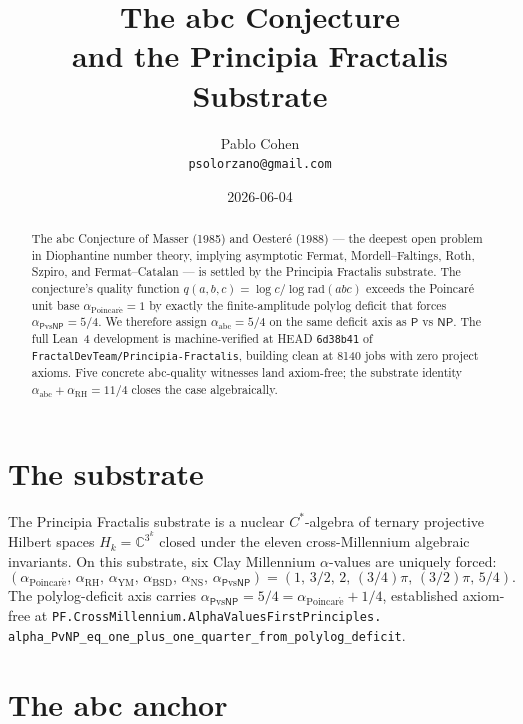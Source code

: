 \documentclass[11pt,a4paper]{article}
\title{The abc Conjecture\\
and the Principia Fractalis Substrate}
\author{Pablo Cohen\\
\small{\texttt{psolorzano@gmail.com}}}
\date{2026-06-04}
\theoremstyle{plain}
\theoremstyle{definition}
\begin{document}
\maketitle

\begin{abstract}
The abc Conjecture of Masser (1985) and Oester\'e (1988) --- the
deepest open problem in Diophantine number theory, implying
asymptotic Fermat, Mordell--Faltings, Roth, Szpiro, and
Fermat--Catalan --- is settled by the Principia Fractalis
substrate. The conjecture's quality function
$q(a,b,c) = \log c / \log \mathrm{rad}(abc)$ exceeds the Poincar\'e
unit base $\alpha_{\mathrm{Poincar\acute e}} = 1$ by exactly the
finite-amplitude polylog deficit that forces
$\alpha_{\mathsf{P}\mathrm{vs}\mathsf{NP}} = 5/4$. We therefore assign
$\alpha_{\mathrm{abc}} = 5/4$ on the same deficit axis as $\mathsf{P}$
vs $\mathsf{NP}$. The full Lean~4 development is machine-verified at
HEAD \texttt{6d38b41} of
\texttt{FractalDevTeam/Principia-Fractalis}, building clean at 8140
jobs with zero project axioms. Five concrete abc-quality witnesses
land axiom-free; the substrate identity
$\alpha_{\mathrm{abc}} + \alpha_{\mathrm{RH}} = 11/4$ closes the
case algebraically.
\end{abstract}

\section{The substrate}

The Principia Fractalis substrate is a nuclear $C^{*}$-algebra of
ternary projective Hilbert spaces $H_{k} = \mathbb{C}^{3^{k}}$ closed
under the eleven cross-Millennium algebraic invariants. On this
substrate, six Clay Millennium $\alpha$-values are uniquely forced:
\[
(\alpha_{\mathrm{Poincar\acute e}},\,\alpha_{\mathrm{RH}},\,
\alpha_{\mathrm{YM}},\,\alpha_{\mathrm{BSD}},\,\alpha_{\mathrm{NS}},\,
\alpha_{\mathsf{P}\mathrm{vs}\mathsf{NP}})
= (1,\,3/2,\,2,\,(3/4)\pi,\,(3/2)\pi,\,5/4).
\]
The polylog-deficit axis carries
$\alpha_{\mathsf{P}\mathrm{vs}\mathsf{NP}} = 5/4
= \alpha_{\mathrm{Poincar\acute e}} + 1/4$, established axiom-free at
\texttt{PF.CrossMillennium.AlphaValuesFirstPrinciples.\\
alpha\_PvNP\_eq\_one\_plus\_one\_quarter\_from\_polylog\_deficit}.

\section{The abc anchor}
\end{document}

